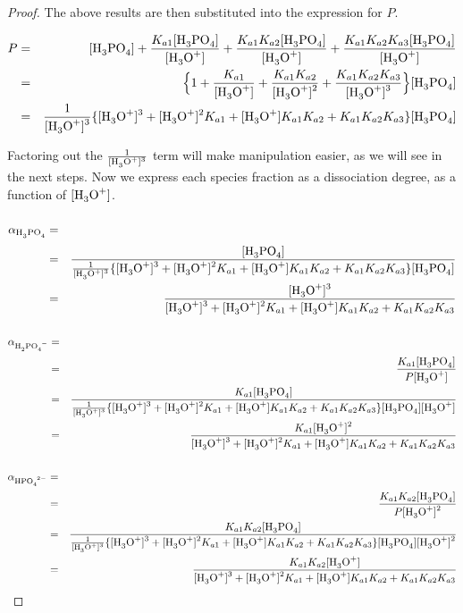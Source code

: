 \documentclass[10pt,twoside,a4paper]{article}
\begin{document}
\begin{proof}
 	The above results are then substituted into the expression for $P$.

 	\begin{eqnarray}
 		P & = & \ce{[H_3PO_4]} + \frac{K_{a1}\ce{[H3PO4]}}{\ce{[H3O+]}} + \frac{K_{a1}K_{a2}\ce{[H3PO4]}}{\ce{[H3O+]}} + \frac{K_{a1}K_{a2}K_{a3}\ce{[H3PO4]}}{\ce{[H3O+]}}  \nonumber \\
 		& = & \Big\{ 1 + \frac{K_{a1}}{\ce{[H3O+]}} + \frac{K_{a1}K_{a2}}{\ce{[H3O+]^2}} + \frac{K_{a1}K_{a2}K_{a3}}{\ce{[H3O+]^3}} \Big\}\ce{[H3PO4]} \nonumber \\
 		& = & \frac{1}{\ce{[H3O+]^3}} \{ \ce{[H3O+]^3} + \ce{[H3O+]^2}K_{a1} + \ce{[H3O+]}K_{a1}K_{a2} + K_{a1}K_{a2}K_{a3}\}\ce{[H3PO4]} \nonumber
 		\end{eqnarray}


 	Factoring out the $\frac{1}{\ce{[H3O+]^3}}$ term will make manipulation easier, as we will see in the next steps. Now we express each species fraction as a dissociation degree, as a function of $\ce{[H3O+]}$.

 	\begin{eqnarray}
 		\alpha_{\ce{H3PO4}} & = & \frac{\ce{[H3PO4]}}{P} \hspace{-10cm} \nonumber \\
 		& = & \frac{\ce{[H3PO4]}}{\frac{1}{\ce{[H3O+]^3}} \{ \ce{[H3O+]^3} + \ce{[H3O+]^2}K_{a1} + \ce{[H3O+]}K_{a1}K_{a2} + K_{a1}K_{a2}K_{a3}\}\ce{[H3PO4]}} \nonumber \\
 		& = & \frac{\ce{[H3O+]^3}}{\ce{[H3O+]^3} + \ce{[H3O+]^2}K_{a1} + \ce{[H3O+]}K_{a1}K_{a2} + K_{a1}K_{a2}K_{a3}}
 		\end{eqnarray}

 	\begin{eqnarray}
 		\alpha_{\ce{H2PO4^{-}}} & = & \frac{\ce{[H2PO4^{-}]}}{P} \hspace{-10cm} \nonumber  \\
 		& = & \frac{K_{a1}\ce{[H3PO4]}}{P\ce{[H3O+]}} \nonumber \\
 		& = & \frac{K_{a1}\ce{[H3PO4]}}{\frac{1}{\ce{[H3O+]^3}} \{ \ce{[H3O+]^3} + \ce{[H3O+]^2}K_{a1} + \ce{[H3O+]}K_{a1}K_{a2} + K_{a1}K_{a2}K_{a3}\}\ce{[H3PO4][H3O+]}} \nonumber \\
 		& = & \frac{K_{a1}\ce{[H3O+]^2}}{\ce{[H3O+]^3} + \ce{[H3O+]^2}K_{a1} + \ce{[H3O+]}K_{a1}K_{a2} + K_{a1}K_{a2}K_{a3}}
 		\end{eqnarray}

 	\begin{eqnarray}
 		\alpha_{\ce{HPO4^{2-}}} & = & \frac{\ce{[HPO4^{2-}]}}{P} \hspace{-10cm} \nonumber  \\
 		& = & \frac{K_{a1}K_{a2}\ce{[H3PO4]}}{P\ce{[H3O+]^2}} \nonumber \\
 		& = & \frac{K_{a1}K_{a2}\ce{[H3PO4]}}{\frac{1}{\ce{[H3O+]^3}} \{ \ce{[H3O+]^3} + \ce{[H3O+]^2}K_{a1} + \ce{[H3O+]}K_{a1}K_{a2} + K_{a1}K_{a2}K_{a3}\}\ce{[H3PO4][H3O+]^2}} \nonumber \\
 		& = & \frac{K_{a1}K_{a2}\ce{[H3O+]}}{\ce{[H3O+]^3} + \ce{[H3O+]^2}K_{a1} + \ce{[H3O+]}K_{a1}K_{a2} + K_{a1}K_{a2}K_{a3}}
 		\end{eqnarray}


\end{proof}
\end{document}
